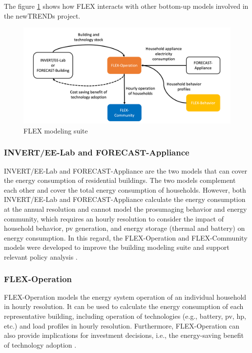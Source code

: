 The figure \ref{fig:flex} shows how FLEX interacts with other bottom-up models involved in the newTRENDs project.

\begin{figure}[h]
  \centering
  \includegraphics[width=\textwidth]{Images/flex.png}
  \caption{FLEX modeling suite}
  \label{fig:flex}
\end{figure}


\subsubsection{INVERT/EE-Lab and FORECAST-Appliance}


INVERT/EE-Lab and FORECAST-Appliance are the two models that can cover the energy consumption of residential buildings. The two models complement each other and cover the total energy consumption of households. 
However, both INVERT/EE-Lab and FORECAST-Appliance calculate the energy consumption at the annual resolution and cannot model the prosumaging behavior and energy community, which requires an hourly resolution to consider the impact of household behavior, \gls{pv} generation, and energy storage (thermal and battery) on energy consumption. 
In this regard, the FLEX-Operation and FLEX-Community models were developed to improve the building modeling suite and support relevant policy analysis \cite{newtrends}. 


\subsubsection{FLEX-Operation}


FLEX-Operation models the energy system operation of an individual household in hourly resolution.  
It can be used to calculate the energy consumption of each representative building, including operation of technologies (e.g., battery, \gls{pv}, \gls{hp}, etc.) and load profiles in hourly resolution. 
Furthermore, FLEX-Operation can also provide implications for investment decisions, i.e., the energy-saving benefit of technology adoption \cite{newtrends}. 

